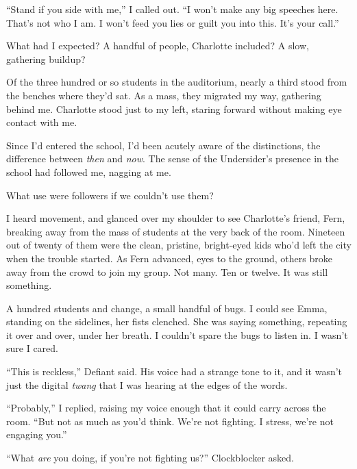 ``Stand if you side with me,'' I called out.  ``I won't make any big speeches here.  That's not who I am.  I won't feed you lies or guilt you into this.  It's your call.''



What had I expected?  A handful of people, Charlotte included?  A slow, gathering buildup?



Of the three hundred or so students in the auditorium, nearly a third stood from the benches where they'd sat.  As a mass, they migrated my way, gathering behind me.  Charlotte stood just to my left, staring forward without making eye contact with me.



Since I'd entered the school, I'd been acutely aware of the distinctions, the difference between \emph{then} and \emph{now}.  The sense of the Undersider's presence in the school had followed me, nagging at me.



What use were followers if we couldn't use them?



I heard movement, and glanced over my shoulder to see Charlotte's friend, Fern, breaking away from the mass of students at the very back of the room.  Nineteen out of twenty of them were the clean, pristine, bright-eyed kids who'd left the city when the trouble started.  As Fern advanced, eyes to the ground, others broke away from the crowd to join my group.  Not many.  Ten or twelve.  It was still something.



A hundred students and change, a small handful of bugs.  I could see Emma, standing on the sidelines, her fists clenched.  She was saying something, repeating it over and over, under her breath.  I couldn't spare the bugs to listen in.  I wasn't sure I cared.



``This is reckless,'' Defiant said.  His voice had a strange tone to it, and it wasn't just the digital \emph{twang }that I was hearing at the edges of the words.



``Probably,'' I replied, raising my voice enough that it could carry across the room.  ``But not as much as you'd think.  We're not fighting.  I stress, we're not engaging you.''



``What \emph{are} you doing, if you're not fighting us?'' Clockblocker asked.



